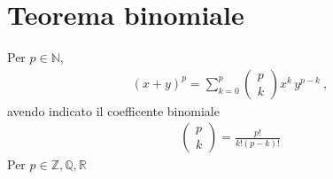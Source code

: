 \documentclass[letterpaper,10pt,english]{jupyterBook}
\begin{document}
\section{Teorema binomiale}
\label{\detokenize{ch/precalculus/polynomials:teorema-binomiale}}\label{\detokenize{ch/precalculus/polynomials:math-hs-precalculus-polynomials-binomial-thm}}
\sphinxAtStartPar
Per \(p \in \mathbb{N}\),
\begin{equation*}
\begin{split}\left( x + y \right)^p = \sum_{k=0}^{p} \left( \begin{matrix} p \\ k \end{matrix} \right) x^k \, y^{p-k} \ ,\end{split}
\end{equation*}
\sphinxAtStartPar
avendo indicato il coefficente binomiale
\begin{equation*}
\begin{split}\left( \begin{matrix} p \\ k \end{matrix} \right) = \frac{p!}{k! (p-k)!}\end{split}
\end{equation*}
\sphinxAtStartPar
Per \(p \in \mathbb{Z}, \mathbb{Q}, \mathbb{R}\)

\sphinxstepscope
\end{document}
